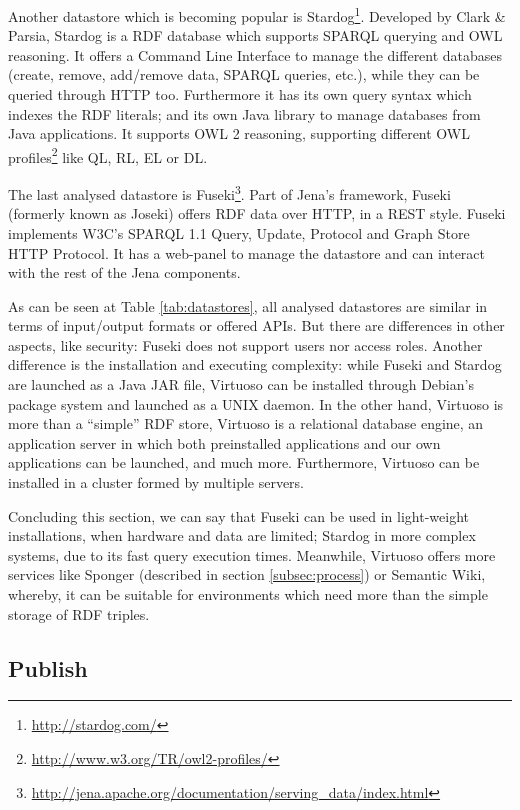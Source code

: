 Another datastore which is becoming popular is Stardog\footnote{\url{http://stardog.com/}}. Developed by Clark \& Parsia, Stardog is a RDF database which supports SPARQL querying and OWL reasoning. It offers a Command Line Interface to manage the different databases (create, remove, add/remove data, SPARQL queries, etc.), while they can be queried through HTTP too. Furthermore it has its own query syntax which indexes the RDF literals; and its own Java library to manage databases from Java applications. It supports OWL 2 reasoning, supporting different OWL profiles\footnote{\url{http://www.w3.org/TR/owl2-profiles/}} like QL, RL, EL or DL.

The last analysed datastore is Fuseki\footnote{\url{http://jena.apache.org/documentation/serving_data/index.html}}. Part of Jena's framework, Fuseki (formerly known as Joseki) offers RDF data over HTTP, in a REST style. Fuseki implements W3C's SPARQL 1.1 Query, Update, Protocol and Graph Store HTTP Protocol. It has a web-panel to manage the datastore and can interact with the rest of the Jena components.

As can be seen at Table \ref{tab:datastores}, all analysed datastores are similar in terms of input/output formats or offered APIs. But there are differences in other aspects, like security: Fuseki does not support users nor access roles. Another difference is the installation and executing complexity: while Fuseki and Stardog are launched as a Java JAR file, Virtuoso can be installed through Debian's package system and launched as a UNIX daemon. In the other hand, Virtuoso is more than a ``simple'' RDF store, Virtuoso is a relational database engine, an application server in which both preinstalled applications and our own applications can be launched, and much more. Furthermore, Virtuoso can be installed in a cluster formed by multiple servers.

Concluding this section, we can say that Fuseki can be used in light-weight installations, when hardware and data are limited; Stardog in more complex systems, due to its fast query execution times. Meanwhile, Virtuoso offers more services like Sponger (described in section \ref{subsec:process}) or Semantic Wiki, whereby, it can be suitable for environments which need more than the simple storage of RDF triples.


\subsection{Publish}\label{subsec:publish}

